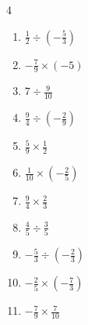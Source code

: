 \begin{multicols}{4}
\begin{enumerate}

  \item $\displaystyle \frac{1}{2}\div{}\left(-\frac{5}{3}\right)$


  \item $\displaystyle -\frac{7}{9}\times{}\left(-5\right)$


  \item $\displaystyle 7\div{}\frac{9}{10}$


  \item $\displaystyle \frac{9}{4}\div{}\left(-\frac{2}{9}\right)$


  \item $\displaystyle \frac{5}{9}\times{}\frac{1}{2}$


  \item $\displaystyle \frac{1}{10}\times{}\left(-\frac{2}{5}\right)$


  \item $\displaystyle \frac{9}{4}\times{}\frac{2}{3}$


  \item $\displaystyle \frac{4}{5}\div{}\frac{3}{5}$


\columnbreak %

  \item $\displaystyle -\frac{5}{3}\div{}\left(-\frac{2}{3}\right)$


  \item $\displaystyle -\frac{2}{5}\times{}\left(-\frac{7}{3}\right)$


  \item $\displaystyle -\frac{7}{9}\times{}\frac{7}{10}$



\end{enumerate}
\end{multicols}
